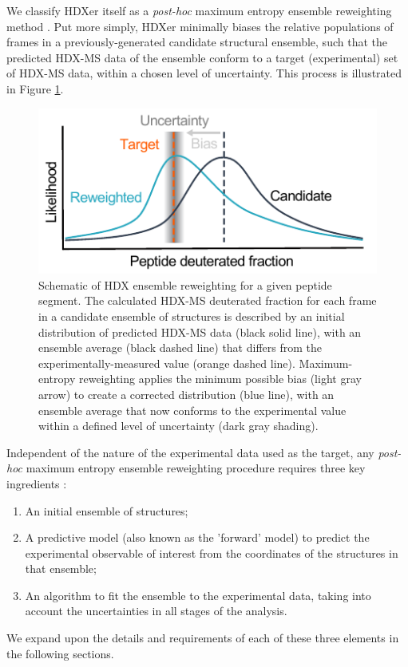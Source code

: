 \documentclass[9pt,tutorial]{livecoms}
\begin{document}
We classify HDXer itself as a \textit{post-hoc} maximum entropy ensemble reweighting method \cite{Pitera2012, Boomsma2014}. 
Put more simply, HDXer minimally biases the relative populations of frames in a previously-generated candidate structural ensemble, such that the predicted HDX-MS data of the ensemble conform to a target (experimental) set of HDX-MS data, within a chosen level of uncertainty.
This process is illustrated in Figure \ref{fig:reweightingschematic}.
\begin{figure}
    \includegraphics[width=0.98\linewidth]{Fig1_HDXer_schematic_v4.pdf}
    \caption{Schematic of HDX ensemble reweighting for a given peptide segment. The calculated HDX-MS deuterated fraction for each frame in a candidate ensemble of structures is described by an initial distribution of predicted HDX-MS data (black solid line), with an ensemble average (black dashed line) that differs from the experimentally-measured value (orange dashed line). Maximum-entropy reweighting applies the minimum possible bias (light gray arrow) to create a corrected distribution (blue line), with an ensemble average that now conforms to the experimental value within a defined level of uncertainty (dark gray shading).}
    \label{fig:reweightingschematic}
\end{figure}

Independent of the nature of the experimental data used as the target, any \textit{post-hoc} maximum entropy ensemble reweighting procedure requires three key ingredients \cite{Orioli2020}:

\begin{enumerate}
\item An initial ensemble of structures;
\item A predictive model (also known as the 'forward' model) to predict the experimental observable of interest from the coordinates of the structures in that ensemble;
\item An algorithm to fit the ensemble to the experimental data, taking into account the uncertainties in all stages of the analysis. 
\end{enumerate}
We expand upon the details and requirements of each of these three elements in the following sections.
\end{document}
